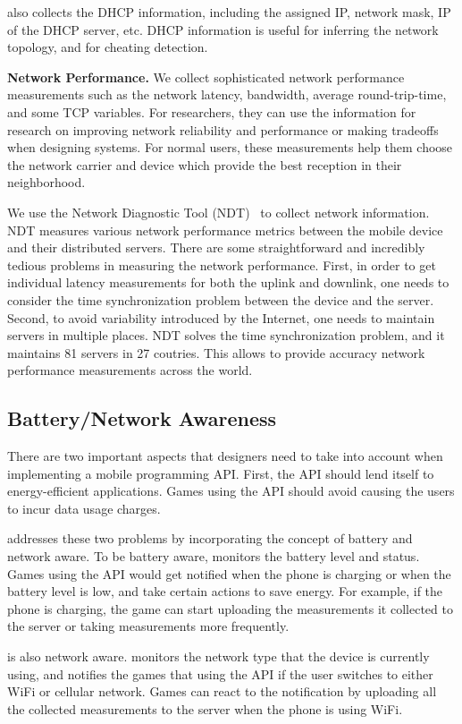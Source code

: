\name{} also collects the DHCP information, including the assigned IP, network mask, IP of the DHCP server, etc.
DHCP information is useful for inferring the network topology, and for cheating detection.


{\bfseries Network Performance.} We collect sophisticated network performance measurements
such as the network latency, bandwidth, average round-trip-time, and some TCP variables.
For researchers, they can use the information for research on improving network reliability and performance or
 making tradeoffs when designing systems.
For normal users, these measurements help them choose the network carrier and device which provide
 the best reception in their neighborhood.

We use the Network Diagnostic Tool (NDT)~\cite{NDT} to collect network information. NDT measures various network
performance metrics between the mobile device and their distributed servers. There are some straightforward
and incredibly tedious problems in measuring the network performance. First, in order to get individual latency
measurements for both the uplink and downlink, one needs to consider the time
synchronization problem between the device and the server. Second, to avoid variability introduced by the Internet,
one needs to maintain servers in multiple places.
NDT solves the time synchronization problem, and it maintains 81 servers in 27 coutries. This allows \name{}
to provide accuracy network performance measurements across the world.

\subsection{Battery/Network Awareness}
\label{ss:awareness}
There are two important aspects that designers need to take into account when implementing a mobile
programming API. First, the API should lend itself to energy-efficient applications.
Games using the API should avoid causing the users to incur data usage charges.

\name{} addresses these two problems by incorporating the concept of battery and network aware.
To be battery aware, \name{} monitors the battery level and status. Games using the API would get
notified when the phone is charging or when the battery level is low, and take certain actions
to save energy. For example, if the phone is charging, the game can start uploading the measurements
it collected to the server or taking measurements more frequently.

\name{} is also network aware. \name{} monitors the network type that the device is currently using,
and notifies the games that using the API if the user switches to either WiFi or cellular network.
Games can react to the notification by uploading all the collected measurements to the server when
the phone is using WiFi.

